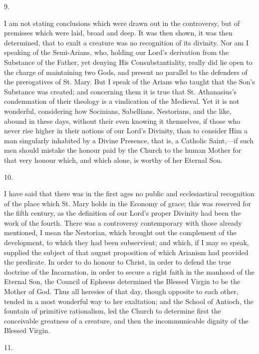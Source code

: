 9.

I am not stating conclusions which were drawn out in
the controversy, but of premisses which were laid, broad
and deep. It was then shown, it was then determined, that
to exalt a creature was no recognition of its divinity.
Nor am I speaking of the Semi-Arians, who, holding our
Lord's derivation from the Substance of the Father, yet
denying His Consubstantiality, really did lie open to the
charge of maintaining two Gods, and present no parallel
to the defenders of the prerogatives of St. Mary. But I
speak of the Arians who taught that the Son's Substance
was created; and concerning them it is true that St.
Athanasius's condemnation of their theology is a
vindication of the Medieval. Yet it is not wonderful,
considering how Socinians, Sabellians, Nestorians, and
the like, abound in these days, without their even
knowing it themselves, if those who never rise higher in
their notions of our Lord's Divinity, than to consider
Him a man singularly inhabited by a Divine Presence, that
is, a Catholic Saint,—if such men should mistake the
honour paid by the Church to the human Mother for that
very honour which, and which alone, is worthy of her
Eternal Son.

10.

I have said that there was in the first ages no public
and ecclesiastical recognition of the place which St.
Mary holds in the Economy of grace; this was reserved for
the fifth century, as the definition of our Lord's proper
Divinity had been the work of the fourth. There was a
controversy contemporary with those already mentioned, I
mean the Nestorian, which brought out the complement of
the development, to which they had been subservient; and
which, if I may so speak, supplied the subject of that
august proposition of which Arianism had provided the
predicate. In order to do honour to Christ, in order to
defend the true doctrine of the Incarnation, in order to
secure a right faith in the manhood of the Eternal Son,
the Council of Ephesus determined the Blessed Virgin to
be the Mother of God. Thus all heresies of that day,
though opposite to each other, tended in a most wonderful
way to her exaltation; and the School of Antioch, the
fountain of primitive rationalism, led the Church to
determine first the conceivable greatness of a creature,
and then the incommunicable dignity of the Blessed
Virgin.

11.


